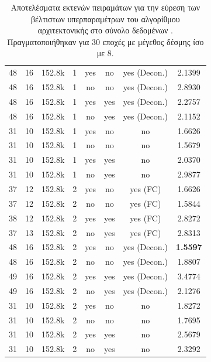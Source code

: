 \begin{table}[h]
\begin{center}
{\begin{tabular}{c c c c c c c c}
            48 & 16 & 152.8k & 1 & yes & no & yes (Decon.) & 2.1399\\%
            48 & 16 & 152.8k & 1 & no & no & yes (Decon.) & 2.8930\\%
            48 & 16 & 152.8k & 1 & yes & yes & yes (Decon.) & 2.2757 \\
            48 & 16 & 152.8k & 1 & no & yes & yes (Decon.) & 2.1152 \\

            31 & 10 & 152.8k & 1 & yes & no & no & 1.6626 \\%
            31 & 10 & 152.8k & 1 & no & no & no & 1.5679 \\%
            31 & 10 & 152.8k & 1 & yes & yes & no & 2.0370 \\
            31 & 10 & 152.8k & 1 & no & yes & no & 2.9877 \\
            \midrule
            37 & 12 & 152.8k & 2 & yes & no & yes (FC) & 1.6626\\ %
            37 & 12 & 152.8k & 2 & no & no & yes (FC) & 1.5844\\%
            38 & 12 & 152.8k & 2 & yes & yes & yes (FC) & 2.8272 \\
            37 & 13 & 152.8k & 2 & no & yes & yes (FC) & 2.8313 \\

            48 & 16 & 152.8k & 2 & yes & no & yes (Decon.) & \textbf{1.5597} \\ %
            48 & 16 & 152.8k & 2 & no & no & yes (Decon.) & 1.8807 \\ %
            49 & 16 & 152.8k & 2 & yes & yes & yes (Decon.) & 3.4774 \\
            49 & 16 & 152.8k & 2 & no & yes & yes (Decon.) & 2.1276  \\

            31 & 10 & 152.8k & 2 & yes & no & no & 1.8272 \\ %
            31 & 10 & 152.8k & 2 & no & no & no & 1.7695\\ %
            31 & 10 & 152.8k & 2 & yes & yes & no & 2.5679 \\
            31 & 10 & 152.8k & 2 & no & yes & no & 2.3292 \\

            \bottomrule
        \end{tabular}
        }
    \end{center}
    \caption[]{\label{tab:method_3_hyper_tuning_RoWSS}Αποτελέσματα εκτενών πειραμάτων για την εύρεση των βέλτιστων υπερπαραμέτρων του αλγορίθμου  αρχιτεκτονικής  στο σύνολο δεδομένων . Πραγματοποιήθηκαν για 30 εποχές με μέγεθος δέσμης ίσο με 8.} 
\end{table}

